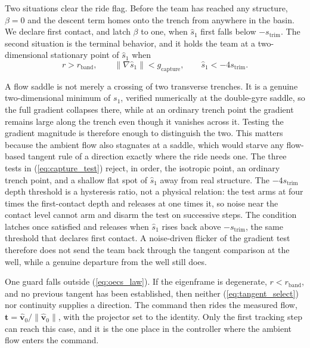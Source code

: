 \documentclass[lettersize,journal]{IEEEtran}
\begin{document}
Two situations clear the ride flag. Before the team has reached any
structure, $\beta = 0$ and the descent term homes onto the trench from
anywhere in the basin. We declare first contact, and latch $\beta$ to
one, when $\hat{s}_1$ first falls below $-s_{\mathrm{trim}}$. The second
situation is the terminal behavior, and it holds the team at a
two-dimensional stationary point of $\hat{s}_1$ when
\begin{equation}
    r > r_{\mathrm{band}}, \qquad
    \lVert\nabla\hat{s}_1\rVert < g_{\mathrm{capture}}, \qquad
    \hat{s}_1 < -4 s_{\mathrm{trim}}.
    \label{eq:capture_test}
\end{equation}

A flow saddle is not merely a crossing of two transverse trenches. It is
a genuine two-dimensional minimum of $s_1$, verified numerically at the
double-gyre saddle, so the full gradient collapses there, while at an
ordinary trench point the gradient remains large along the trench even
though it vanishes across it. Testing the gradient magnitude is
therefore enough to distinguish the two. This matters because the
ambient flow also stagnates at a saddle, which would starve any
flow-based tangent rule of a direction exactly where the ride needs one.
The three tests in (\ref{eq:capture_test}) reject, in order, the
isotropic point, an ordinary trench point, and a shallow flat spot of
$\hat{s}_1$ away from real structure. The $-4s_{\mathrm{trim}}$ depth
threshold is a hysteresis ratio, not a physical relation: the test arms
at four times the first-contact depth and releases at one times it, so
noise near the contact level cannot arm and disarm the test on
successive steps. The condition latches once
satisfied and releases when $\hat{s}_1$ rises back above
$-s_{\mathrm{trim}}$, the same threshold that declares first contact. A
noise-driven flicker of the gradient test therefore does not send the
team back through the tangent comparison at the well, while a genuine
departure from the well still does.

One guard falls outside (\ref{eq:oecs_law}). If the eigenframe is
degenerate, $r < r_{\mathrm{band}}$, and no previous tangent has been
established, then neither (\ref{eq:tangent_select}) nor continuity
supplies a direction. The command then rides the measured flow,
$\mathbf{t} = \hat{\mathbf{v}}_0/\|\hat{\mathbf{v}}_0\|$, with the
projector set to the identity. Only the first tracking step can reach
this case, and it is the one place in the controller where the ambient
flow enters the command.
\end{document}
